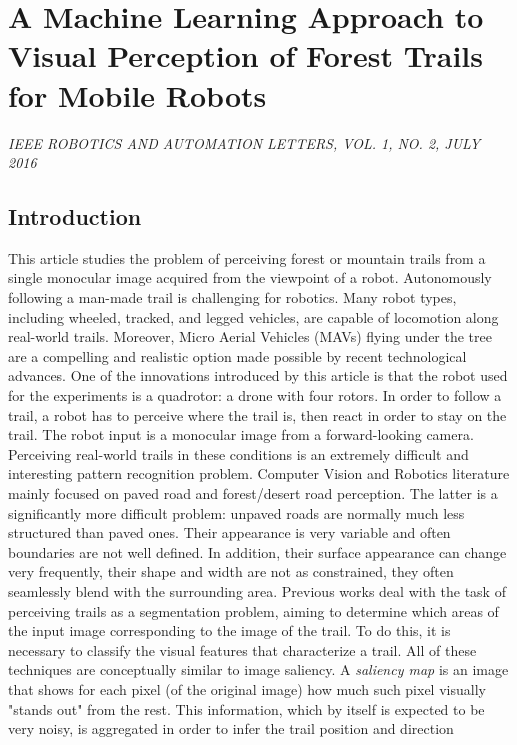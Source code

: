 \section{A Machine Learning Approach to Visual Perception of Forest
Trails for Mobile Robots}\label{header-n5}

\emph{IEEE ROBOTICS AND AUTOMATION LETTERS, VOL. 1, NO. 2, JULY 2016}

\subsection{Introduction}\label{header-n7}

This article studies the problem of perceiving forest or mountain trails
from a single monocular image acquired from the viewpoint of a robot.
Autonomously following a man-made trail is challenging for robotics.
Many robot types, including wheeled, tracked, and legged vehicles, are
capable of locomotion along real-world trails. Moreover, Micro Aerial
Vehicles (MAVs) flying under the tree are a compelling and realistic
option made possible by recent technological advances. One of the
innovations introduced by this article is that the robot used for the
experiments is a quadrotor: a drone with four rotors. In order to follow
a trail, a robot has to perceive where the trail is, then react in order
to stay on the trail. The robot input is a monocular image from a
forward-looking camera. Perceiving real-world trails in these conditions
is an extremely difficult and interesting pattern recognition problem.
Computer Vision and Robotics literature mainly focused on paved road and
forest/desert road perception. The latter is a significantly more
difficult problem: unpaved roads are normally much less structured than
paved ones. Their appearance is very variable and often boundaries are
not well defined. In addition, their surface appearance can change very
frequently, their shape and width are not as constrained, they often
seamlessly blend with the surrounding area. Previous works deal with the
task of perceiving trails as a segmentation problem, aiming to determine
which areas of the input image corresponding to the image of the trail.
To do this, it is necessary to classify the visual features that
characterize a trail. All of these techniques are conceptually similar
to image saliency. A \emph{saliency map} is an image that shows for each
pixel (of the original image) how much such pixel visually "stands out"
from the rest. This information, which by itself is expected to be very
noisy, is aggregated in order to infer the trail position and direction
